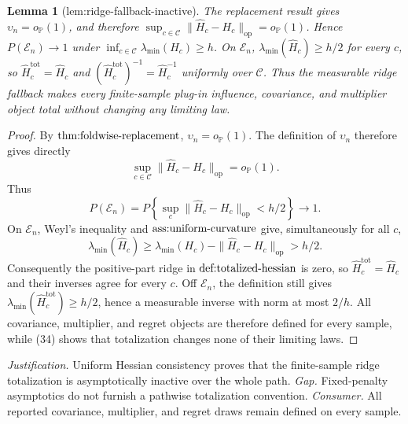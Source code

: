 \documentclass{article}
\newtheorem{lemma}{Lemma}
\begin{document}
\begin{lemma}[lem:ridge-fallback-inactive]\label{lem:ridge-fallback-inactive}
The replacement result gives \(\upsilon_n=o_{\mathbb P}(1)\), and therefore \(\sup_{c\in\mathcal C}\|\widehat H_c-H_c\|_{\mathrm{op}}=o_{\mathbb P}(1)\). Hence \(P(\mathcal E_n)\to1\) under \(\inf_{c\in\mathcal C}\lambda_{\min}(H_c)\ge h\). On \(\mathcal E_n\), \(\lambda_{\min}(\widehat H_c)\ge h/2\) for every \(c\), so \(\widehat H_c^{\mathrm{tot}}=\widehat H_c\) and \((\widehat H_c^{\mathrm{tot}})^{-1}=\widehat H_c^{-1}\) uniformly over \(\mathcal C\). Thus the measurable ridge fallback makes every finite-sample plug-in influence, covariance, and multiplier object total without changing any limiting law.
\end{lemma}
\begin{proof}
By \(\textnormal{thm:foldwise-replacement}\), \(\upsilon_n=o_{\mathbb P}(1)\). The definition of \(\upsilon_n\) therefore gives directly
\[
 \sup_{c\in\mathcal C}\|\widehat H_c-H_c\|_{\mathrm{op}}=o_{\mathbb P}(1).
 \tag{34}
\]
Thus
\[
 P(\mathcal E_n)
 =P\left\{\sup_c\|\widehat H_c-H_c\|_{\mathrm{op}}<h/2\right\}\longrightarrow1.
\]
On \(\mathcal E_n\), Weyl's inequality and \(\textnormal{ass:uniform-curvature}\) give, simultaneously for all \(c\),
\[
 \lambda_{\min}(\widehat H_c)
 \geq\lambda_{\min}(H_c)-\|\widehat H_c-H_c\|_{\mathrm{op}}>h/2.
\]
Consequently the positive-part ridge in \(\textnormal{def:totalized-hessian}\) is zero, so \(\widehat H_c^{\mathrm{tot}}=\widehat H_c\) and their inverses agree for every \(c\). Off \(\mathcal E_n\), the definition still gives \(\lambda_{\min}(\widehat H_c^{\mathrm{tot}})\geq h/2\), hence a measurable inverse with norm at most \(2/h\). All covariance, multiplier, and regret objects are therefore defined for every sample, while (34) shows that totalization changes none of their limiting laws.
\end{proof}
\par\smallskip\noindent \textit{Justification.} Uniform Hessian consistency proves that the finite-sample ridge totalization is asymptotically inactive over the whole path. \textit{Gap.} Fixed-penalty asymptotics do not furnish a pathwise totalization convention. \textit{Consumer.} All reported covariance, multiplier, and regret draws remain defined on every sample.
\end{document}
